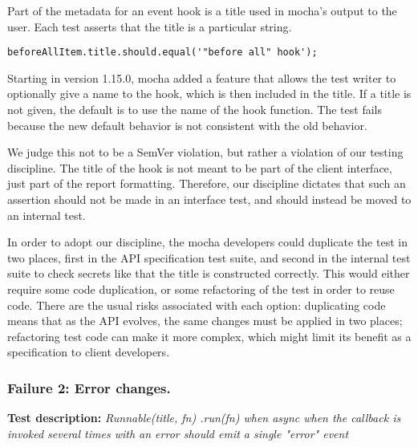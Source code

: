 Part of the metadata for an event hook is a title used in mocha's
output to the user. Each test asserts that the title is a particular
string.

{\small
\begin{verbatim}
beforeAllItem.title.should.equal('"before all" hook');
\end{verbatim}
}

Starting in version 1.15.0, mocha added a feature that allows the test
writer to optionally give a name to the hook, which is then included
in the title. If a title is not given, the default is to use the name
of the hook function. The test fails because the new default behavior
is not consistent with the old behavior.

We judge this not to be a SemVer violation, but rather a violation of
our testing discipline. The title of the hook is not meant to be part
of the client interface, just part of the report
formatting. Therefore, our discipline dictates that such an assertion
should not be made in an interface test, and should instead be moved
to an internal test.

In order to adopt our discipline, the mocha developers could duplicate
the test in two places, first in the API specification test suite, and
second in the internal test suite to check secrets like that the title
is constructed correctly. This would either require some code
duplication, or some refactoring of the test in order to reuse
code. There are the usual risks associated with each option:
duplicating code means that as the API evolves, the same changes must
be applied in two places; refactoring test code can make it more
complex, which might limit its benefit as a specification to client
developers.

\subsubsection{Failure 2: Error changes.}
\label{sec:failure2}
{\bf Test description: }
%
{\em Runnable(title, fn) .run(fn) when async when the callback is
  invoked several times with an error should emit a single "error"
  event }

